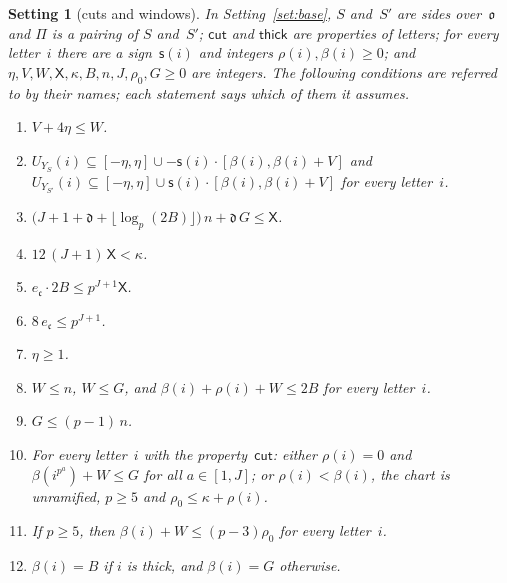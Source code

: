 \documentclass[11pt,a4paper]{article}
\newcommand{\m}[1]{\mbox{$#1$}}        %
\theoremstyle{plainx}
\theoremstyle{uprightx}
\newtheorem{setting}[theorem]{Setting}          %
\providecommand{\fo}{\mathfrak{o}}\providecommand{\fc}{\mathfrak{c}}\providecommand{\fd}{\mathfrak{d}}
\providecommand{\JumpWin}[5]{#5\subseteq[-#1,#1]\cup#2\cdot[#3,#3+#4]}
\begin{document}
\begin{setting}[cuts and windows]\label{set:cut}
In Setting~\ref{set:base}, $S$ and~$S'$ are sides over~$\fo$ and $\Pi$ is a pairing of $S$ and~$S'$;
$\mathsf{cut}$ and $\mathsf{thick}$ are properties of letters; for every letter~$i$ there are a
sign~\m{\mathsf{s}(i)} and integers $\rho(i),\beta(i)\ge0$; and
$\eta,V,W,\mathsf{X},\kappa,B,n,J,\rho_0,G\ge0$ are integers. The following conditions are referred to by their names;
each statement says which of them it assumes.
\begin{enumerate}[label=\textup{(W\arabic*)},leftmargin=3.2em,itemsep=2pt]
\item \m{V+4\eta\le W}.
\item $\JumpWin{\eta}{-\mathsf{s}(i)}{\beta(i)}{V}{U_{Y_S}(i)}$ and
$\JumpWin{\eta}{\mathsf{s}(i)}{\beta(i)}{V}{U_{Y_{S'}}(i)}$ for every letter~$i$.
\item $\bigl(J+1+\fd+\lfloor\log_p(2B)\rfloor\bigr)\,n+\fd\,G\le \mathsf{X}$.
\item $12\,(J+1)\,\mathsf{X}<\kappa$.
\item $e_{\fc}\cdot2B\le p^{J+1}\mathsf{X}$.
\item $8\,e_{\fc}\le p^{J+1}$.
\item \m{\eta\ge1}.
\item \m{W\le n}, \m{W\le G}, and $\beta(i)+\rho(i)+W\le2B$ for every letter~$i$.
\item \m{G\le(p-1)\,n}.
\item For every letter~$i$ with the property~$\mathsf{cut}$: either \m{\rho(i)=0} and
$\beta(i^{p^{a}})+W\le G$ for all \m{a\in[1,J]}; or \m{\rho(i)<\beta(i)}, the chart is unramified,
\m{p\ge5} and $\rho_0\le\kappa+\rho(i)$.
\item If \m{p\ge5}, then $\beta(i)+W\le(p-3)\rho_0$ for every letter~$i$.
\item \m{\beta(i)=B} if $i$ is thick, and \m{\beta(i)=G} otherwise.
\end{enumerate}
\end{setting}
\end{document}
